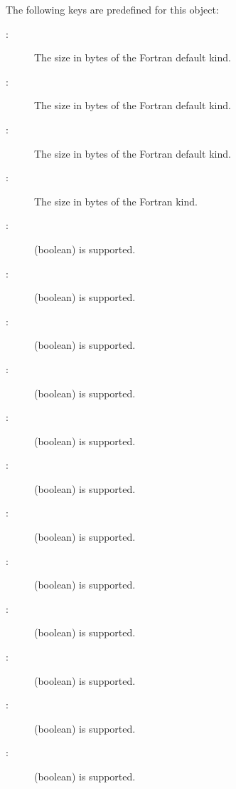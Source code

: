 The following keys are predefined for this object:
\begin{description}
\item[:] The size in bytes of the Fortran default  kind.
\item[:] The size in bytes of the Fortran default  kind.
\item[:] The size in bytes of the Fortran default  kind.
\item[:] The size in bytes of the Fortran  kind.
\item[:]  (boolean)  is supported.
\item[:]  (boolean)  is supported.
\item[:]  (boolean)  is supported.
\item[:]  (boolean)  is supported.
\item[:] (boolean)  is supported.
\item[:]  (boolean)  is supported.
\item[:]  (boolean)  is supported.
\item[:]  (boolean)  is supported.
\item[:]  (boolean)  is supported.
\item[:] (boolean)  is supported.
\item[:]     (boolean)  is supported.
\item[:]     (boolean)  is supported.

\end{description}
